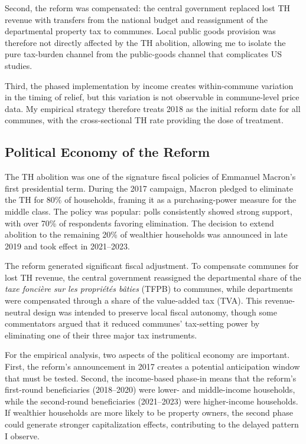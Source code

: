 \documentclass[12pt]{article}
\begin{document}
Second, the reform was compensated: the central government replaced lost TH revenue with transfers from the national budget and reassignment of the departmental property tax to communes. Local public goods provision was therefore not directly affected by the TH abolition, allowing me to isolate the pure tax-burden channel from the public-goods channel that complicates US studies.

Third, the phased implementation by income creates within-commune variation in the timing of relief, but this variation is not observable in commune-level price data. My empirical strategy therefore treats 2018 as the initial reform date for all communes, with the cross-sectional TH rate providing the dose of treatment.

\subsection{Political Economy of the Reform}

The TH abolition was one of the signature fiscal policies of Emmanuel Macron's first presidential term. During the 2017 campaign, Macron pledged to eliminate the TH for 80\% of households, framing it as a purchasing-power measure for the middle class. The policy was popular: polls consistently showed strong support, with over 70\% of respondents favoring elimination. The decision to extend abolition to the remaining 20\% of wealthier households was announced in late 2019 and took effect in 2021--2023.

The reform generated significant fiscal adjustment. To compensate communes for lost TH revenue, the central government reassigned the departmental share of the \emph{taxe fonci\`{e}re sur les propri\'{e}t\'{e}s b\^{a}ties} (TFPB) to communes, while departments were compensated through a share of the value-added tax (TVA). This revenue-neutral design was intended to preserve local fiscal autonomy, though some commentators argued that it reduced communes' tax-setting power by eliminating one of their three major tax instruments.

For the empirical analysis, two aspects of the political economy are important. First, the reform's announcement in 2017 creates a potential anticipation window that must be tested. Second, the income-based phase-in means that the reform's first-round beneficiaries (2018--2020) were lower- and middle-income households, while the second-round beneficiaries (2021--2023) were higher-income households. If wealthier households are more likely to be property owners, the second phase could generate stronger capitalization effects, contributing to the delayed pattern I observe.
\end{document}

